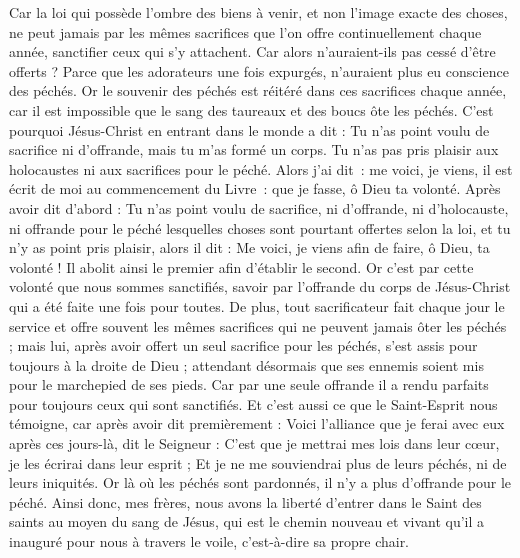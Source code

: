 \begin{multicols}{2}
\VerseOne{}Car la loi qui possède l'ombre des biens à venir, et non l’image exacte des choses, ne peut jamais par les mêmes sacrifices que l'on offre continuellement chaque année, sanctifier ceux qui s'y attachent.
Car alors n’auraient-ils pas cessé d’être offerts ? Parce que les adorateurs une fois expurgés, n’auraient plus eu conscience des péchés.
Or le souvenir des péchés est réitéré dans ces sacrifices chaque année,
car il est impossible que le sang des taureaux et des boucs ôte les péchés.
C'est pourquoi Jésus-Christ en entrant dans le monde a dit : Tu n'as point voulu de sacrifice ni d'offrande, mais tu m'as formé un corps.
Tu n'as pas pris plaisir aux holocaustes ni aux sacrifices pour le péché.
Alors j’ai dit : me voici, je viens, il est écrit de moi au commencement du Livre : que je fasse, ô Dieu ta volonté.
Après avoir dit d’abord : Tu n'as point voulu de sacrifice, ni d'offrande, ni d'holocauste, ni offrande pour le péché lesquelles choses sont pourtant offertes selon la loi, et tu n'y as point pris plaisir, alors il dit : Me voici, je viens afin de faire, ô Dieu, ta volonté !
Il abolit ainsi le premier afin d'établir le second.
Or c'est par cette volonté que nous sommes sanctifiés, savoir par l'offrande du corps de Jésus-Christ qui a été faite une fois pour toutes.
De plus, tout sacrificateur fait chaque jour le service et offre souvent les mêmes sacrifices qui ne peuvent jamais ôter les péchés ;
mais lui, après avoir offert un seul sacrifice pour les péchés, s’est assis pour toujours à la droite de Dieu ;
attendant désormais que ses ennemis soient mis pour le marchepied de ses pieds.
Car par une seule offrande il a rendu parfaits pour toujours ceux qui sont sanctifiés.
Et c'est aussi ce que le Saint-Esprit nous témoigne, car après avoir dit premièrement :
Voici l'alliance que je ferai avec eux après ces jours-là, dit le Seigneur : C'est que je mettrai mes lois dans leur cœur, je les écrirai dans leur esprit ; 
Et je ne me souviendrai plus de leurs péchés, ni de leurs iniquités.
Or là où les péchés sont pardonnés, il n'y a plus d’offrande pour le péché.
Ainsi donc, mes frères, nous avons la liberté d'entrer dans le Saint des saints au moyen du sang de Jésus,
qui est le chemin nouveau et vivant qu'il a inauguré pour nous à travers le voile, c’est-à-dire sa propre chair.

\end{multicols}
